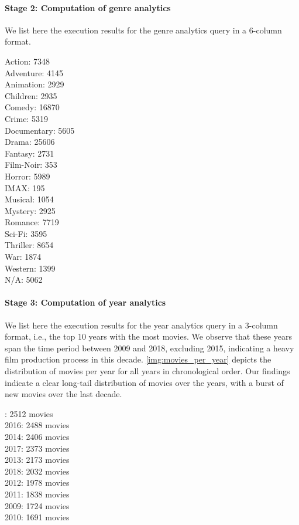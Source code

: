 \documentclass[acmlarge]{acmart}
\begin{document}
  \paragraph{Stage 2: Computation of genre analytics}
  We list here the execution results for the genre analytics query in a 6-column format.
  \begin{multicols}{6}
    \noindent
    Action: 7348
    \\ Adventure: 4145
    \\ Animation: 2929
    \\ Children: 2935
    \\ Comedy: 16870
    \\ Crime: 5319
    \\ Documentary: 5605
    \\ Drama: 25606
    \\ Fantasy: 2731
    \\ Film-Noir: 353
    \\ Horror: 5989
    \\ IMAX: 195
    \\ Musical: 1054
    \\ Mystery: 2925
    \\ Romance: 7719
    \\ Sci-Fi: 3595
    \\ Thriller: 8654
    \\ War: 1874
    \\ Western: 1399
    \\ N/A: 5062
  \end{multicols}

  \paragraph{Stage 3: Computation of year analytics}
  We list here the execution results for the year analytics query in a 3-column format, i.e., the top 10 years with the most movies. We observe that these years span the time period between 2009 and 2018, excluding 2015, indicating a heavy film production process in this decade. \autoref{img:movies_per_year} depicts the distribution of movies per year for all years in chronological order. Our findings indicate a clear long-tail distribution of movies over the years, with a burst of new movies over the last decade.
  \begin{multicols}{3}
    \centering
    : 2512 movies
    \\ 2016: 2488 movies
    \\ 2014: 2406 movies
    \\ 2017: 2373 movies
    \\ 2013: 2173 movies
    \\ 2018: 2032 movies
    \\ 2012: 1978 movies
    \\ 2011: 1838 movies
    \\ 2009: 1724 movies
    \\ 2010: 1691 movies
  \end{multicols}
\end{document}
